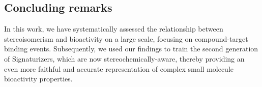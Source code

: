 \subsection{Concluding remarks}

In this work, we have systematically assessed the relationship between stereoisomerism and bioactivity on a large scale, focusing on compound-target binding events. Subsequently, we used our findings to train the second generation of Signaturizers, which are now stereochemically-aware, thereby providing an even more faithful and accurate representation of complex small molecule bioactivity properties.


